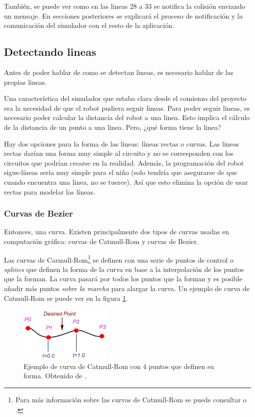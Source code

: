 También, se puede ver como en las lineas 28 a 33 se notifica la colisión enviando un mensaje. En secciones posteriores se explicará el proceso de notificación y la comunicación del simulador con el resto de la aplicación.

\subsection{Detectando lineas}
\label{detectando-lineas}

Antes de poder hablar de como se detectan lineas, es necesario hablar de las propias lineas.

Una característica del simulador que estaba clara desde el comienzo del proyecto era la necesidad de que el robot pudiera seguir lineas. Para poder seguir lineas, es necesario poder calcular la distancia del robot a una linea. Esto implica el cálculo de la distancia de un punto a una linea. Pero, ¿qué forma tiene la linea?

Hay dos opciones para la forma de las lineas: líneas rectas o curvas. Las lineas rectas darían una forma muy simple al circuito y no se corresponden con los circuitos que podrían crearse en la realidad. Además, la programación del robot sigue-líneas sería muy simple para el niño (solo tendría que asegurarse de que cuando encuentra una linea, no se tuerce). Así que esto elimina la opción de usar rectas para modelar las líneas. 


\subsubsection{Curvas de Bezier}
\label{bezier}

Entonces, una curva. Existen principalmente dos tipos de curvas usadas en computación gráfica: curvas de Catmull-Rom y curvas de Bezier. 

Las curvas de Carmull-Rom\footnote{Para más información sobre las curvas de Catmull-Rom se puede consultar \cite{curves-catmull-rom-introduction} o \cite{catmull-rom-splines}.} se definen con una serie de puntos de control o \emph{splines} que definen la forma de la curva en base a la interpolación de los puntos que la forman. La curva pasará por todos los puntos que la forman y es posible añadir más puntos \emph{sobre la marcha} para alargar la curva. Un ejemplo de curva de Catmull-Rom se puede ver en la figura \ref{fig:curva-catmull}.


\begin{figure}[!ht]
	\begin{centering}
		\includegraphics[width=0.4\textwidth]{images/curva-catmull.png}
			\caption{Ejemplo de curva de Catmull-Rom con 4 puntos que definen su forma. Obtenido de \cite{curves-catmull-rom-introduction}.}
				\label{fig:curva-catmull}
	\end{centering}
\end{figure}


